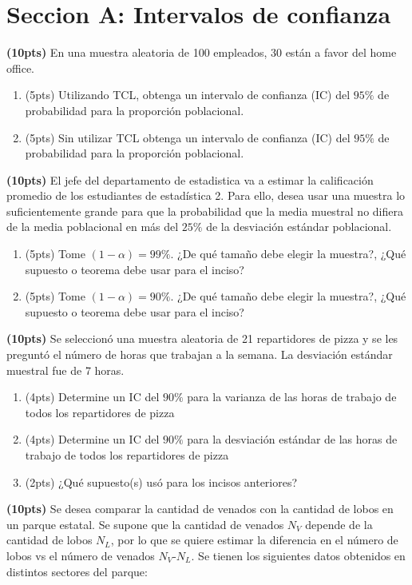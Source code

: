 \documentclass[addpoints]{exam}
\theoremstyle{mytheor}
\begin{document}
\section*{Seccion A: Intervalos de confianza }
\begin{questions} 

\question \textbf{(10pts)} En una muestra aleatoria de 100 empleados, 30 están a favor del home office. 
\begin{enumerate}[label=\Alph*)]
\item (5pts) Utilizando TCL, obtenga un intervalo de confianza (IC) del $95\%$ de probabilidad para la proporción poblacional. 
\item (5pts) Sin utilizar TCL obtenga un intervalo de confianza (IC) del $95\%$ de probabilidad para la proporción poblacional. 
\end{enumerate}

\question \textbf{(10pts)} El jefe del departamento de estadistica va a estimar la calificación promedio de los estudiantes de estadística 2. Para ello, desea usar una muestra lo suficientemente grande para que la probabilidad que la media muestral no difiera de la media poblacional en más del $25\%$ de la desviación estándar poblacional. 
\begin{enumerate}[label=\Alph*)]
\item (5pts) Tome $(1-\alpha)= 99\%$. ¿De qué tamaño debe elegir la muestra?, ¿Qué supuesto o teorema debe usar para el inciso?
\item (5pts) Tome $(1-\alpha)= 90\%$. ¿De qué tamaño debe elegir la muestra?, ¿Qué supuesto o teorema debe usar para el inciso?
\end{enumerate}

\question \textbf{(10pts)} Se seleccionó una muestra aleatoria de 21 repartidores de pizza y se les preguntó el número de horas que trabajan a la semana. La desviación estándar muestral fue de 7 horas. 
\begin{enumerate}[label=\Alph*)]
\item (4pts) Determine un IC del $90\%$ para la varianza de las horas de trabajo de todos los repartidores de pizza
\item (4pts) Determine un IC del $90\%$ para la desviación estándar de las horas de trabajo de todos los repartidores de pizza
\item (2pts) ¿Qué supuesto(s) usó para los incisos anteriores?
\end{enumerate}

\question \textbf{(10pts)} Se desea comparar la cantidad de venados con la cantidad de lobos en un parque estatal. Se supone que la cantidad de venados $N_V$ depende de la cantidad de lobos $N_L$, por lo que se quiere estimar la diferencia en el número de lobos vs el número de venados $N_V$-$N_L$. Se tienen los siguientes datos obtenidos en distintos sectores del parque:


\end{questions}
\end{document}
